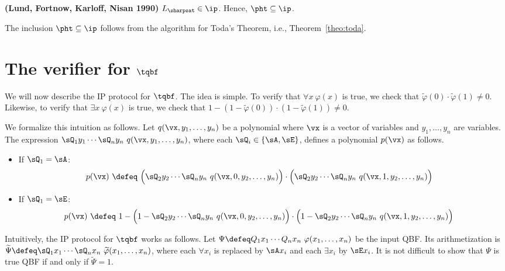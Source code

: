 \documentclass[11pt, a4paper]{article}
\begin{document}
\begin{theorem}
\label{theo:sharpsat-ip}
{\bf (Lund, Fortnow, Karloff, Nisan 1990)}
$L_{\sharpsat}\in \ip$.
Hence, $\pht\subseteq \ip$.
\end{theorem}

The inclusion $\pht\subseteq \ip$ follows from the algorithm for Toda's Theorem, i.e., Theorem~\ref{theo:toda}.


\section{The verifier for $\tqbf$}

We will now describe the IP protocol for $\tqbf$.
The idea is simple.
To verify that $\forall x\ \varphi(x)$ is true,
we check that $\widetilde{\varphi}(0)\cdot \widetilde{\varphi}(1)\neq 0$.
Likewise, to verify that $\exists x\ \varphi(x)$ is true,
we check that $1- (1-\widetilde{\varphi}(0)) \cdot (1- \widetilde{\varphi}(1))\neq 0$.

We formalize this intuition as follows.
Let $q(\vx,y_1,\ldots,y_n)$ be a polynomial
where $\vx$ is a vector of variables and $y_1,\ldots,y_n$ are variables.
The expression $\sQ_1 y_1\cdots  \sQ_n y_n\ q(\vx,y_1,\ldots,y_n)$,
where each $\sQ_i \in \{\sA,\sE\}$,
defines a polynomial $p(\vx)$ as follows.
\begin{itemize}
\item
If $\sQ_1 = \sA$:
\begin{align*}
p(\vx) & \ \defeq \
\Big(\sQ_2y_2 \cdots \sQ_n y_n \ q(\vx,0,y_2,\ldots,y_n)\Big)\cdot
\Big(\sQ_2y_2 \cdots \sQ_n y_n \ q(\vx,1,y_2,\ldots,y_n)\Big)
\end{align*}
\item 
If $\sQ_1 = \sE$:
\begin{align*}
p(\vx) & \ \defeq \
1 - \Big(1- \sQ_2y_2 \cdots \sQ_n y_n \ q(\vx,0,y_2,\ldots,y_n)\Big)\cdot
\Big(1- \sQ_2y_2 \cdots \sQ_n y_n \ q(\vx,1,y_2,\ldots,y_n)\Big)
\end{align*}
\end{itemize}

Intuitively, the IP protocol for $\tqbf$ works as follows.
Let $\Psi \defeq Q_1x_1\cdots Q_nx_n\ \varphi(x_1,\ldots,x_n)$ be the input QBF.
Its arithmetization is $\widetilde{\Psi} \defeq  \sQ_1x_1\cdots \sQ_nx_n\ \widetilde{\varphi}(x_1,\ldots,x_n)$,
where each $\forall x_i$ is replaced by $\sA x_i$ and each $\exists x_i$ by $\sE x_i$.
It is not difficult to show that $\Psi$ is true QBF if and only if $\widetilde{\Psi}=1$.
\end{document}
